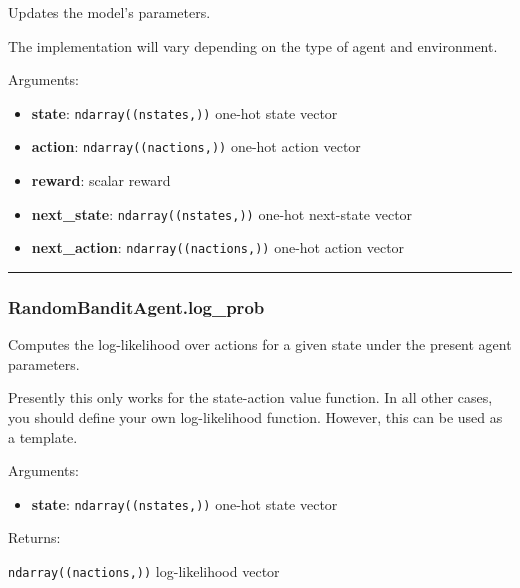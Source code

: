 Updates the model's parameters.

The implementation will vary depending on the type of agent and
environment.

Arguments:

\begin{itemize}
\tightlist
\item
  \textbf{state}: \texttt{ndarray((nstates,))} one-hot state vector
\item
  \textbf{action}: \texttt{ndarray((nactions,))} one-hot action vector
\item
  \textbf{reward}: scalar reward
\item
  \textbf{next\_state}: \texttt{ndarray((nstates,))} one-hot next-state
  vector
\item
  \textbf{next\_action}: \texttt{ndarray((nactions,))} one-hot action
  vector
\end{itemize}

\begin{center}\rule{0.5\linewidth}{\linethickness}\end{center}

\subsubsection{RandomBanditAgent.log\_prob}\label{randombanditagent.log_prob}

\begin{Shaded}
\begin{Highlighting}[]
\end{Highlighting}
\end{Shaded}

Computes the log-likelihood over actions for a given state under the
present agent parameters.

Presently this only works for the state-action value function. In all
other cases, you should define your own log-likelihood function.
However, this can be used as a template.

Arguments:

\begin{itemize}
\tightlist
\item
  \textbf{state}: \texttt{ndarray((nstates,))} one-hot state vector
\end{itemize}

Returns:

\texttt{ndarray((nactions,))} log-likelihood vector

